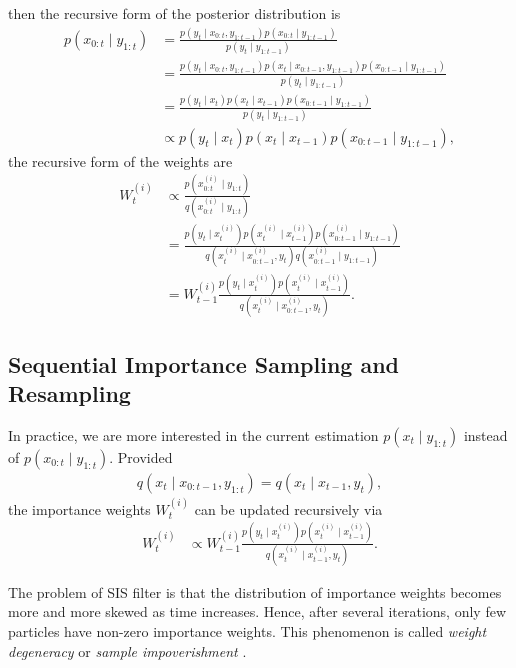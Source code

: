 then the recursive form of the posterior distribution is 
\begin{align*}
p(x_{0:t}\mid y_{1:t}) &= \frac{p(y_t \mid x_{0:t},y_{1:t-1})p(x_{0:t}\mid y_{1:t-1})}{p(y_t \mid y_{1:t-1})}\\
&= \frac{p(y_t \mid x_{0:t},y_{1:t-1}) p(x_t \mid x_{0:t-1},y_{1:t-1}) p(x_{0:t-1}\mid y_{1:t-1} ) }{p(y_t \mid y_{1:t-1})}\\
&= \frac{p(y_t \mid x_t ) p(x_t \mid x_{t-1}) p(x_{0:t-1}\mid y_{1:t-1} ) }{p(y_t \mid y_{1:t-1})}\\
&\propto p(y_t \mid x_t ) p(x_t \mid x_{t-1}) p(x_{0:t-1}\mid y_{1:t-1} ),
\end{align*}
the recursive form of the weights are
\begin{align*}
W_t^{(i)} &\propto \frac{p\left(x_{0:t}^{(i)}\mid y_{1:t}\right)}{q\left(x_{0:t}^{(i)}\mid y_{1:t}\right)}\\
&= \frac{ p\left(y_{t}\mid x_{t}^{(i)}\right) p\left(x_{t}^{(i)}\mid x_{t-1}^{(i)}\right)  p\left(x_{0:t-1}^{(i)}\mid y_{1:t-1}\right)}   { q\left(x_{t}^{(i)}\mid x_{0:t-1}^{(i)},y_{t}\right)  q\left(x_{0:t-1}^{(i)}\mid y_{1:t-1}\right) } \\
&= W_{t-1}^{(i)} \frac{ p\left(y_{t}\mid x_{t}^{(i)}\right) p\left(x_{t}^{(i)}\mid x_{t-1}^{(i)}\right) }   {q\left(x_{t}^{(i)}\mid x_{0:t-1}^{(i)},y_{t}\right)}.
\end{align*}

\subsection{Sequential Importance Sampling and Resampling}
 
In practice, we are more interested in the current estimation $p(x_t \mid y_{1:t})$ instead of $p(x_{0:t}\mid y_{1:t})$. Provided 
\begin{align*}
q(x_t \mid  x_{0:t-1},y_{1:t})=q(x_t \mid  x_{t-1},y_t ),
\end{align*}
the importance weights $W_t^{(i)}$ can be updated recursively via 
\begin{align*}
W_t^{(i)} &\propto W_{t-1}^{(i)} \frac{ p\left(y_t \mid x_t^{(i)}\right) p\left(x_{t}^{(i)}\mid x_{t-1}^{(i)}\right) }   {q\left(x_{t}^{(i)}\mid x_{t-1}^{(i)},y_{t}\right)}.
\end{align*}

The problem of SIS filter is that the distribution of importance weights becomes more and more skewed as time increases. Hence, after several iterations, only few particles have non-zero importance weights. This phenomenon is called \textit{weight degeneracy} or \textit{sample impoverishment} \citep{smcmip2011}.


